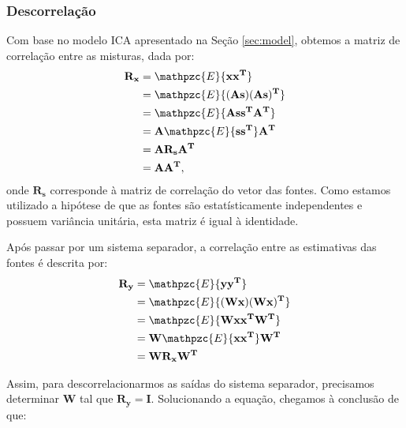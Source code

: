     \subsubsection{Descorrelação}
    Com base no modelo ICA apresentado na Seção \ref{sec:model}, obtemos a matriz de correlação entre as misturas, dada por:
    \begin{equation}
        \label{eq:correlationmatrixforx}
        \begin{split}
        \mathbf{R_x} & = \mathpzc{E}\{\mathbf{xx^T}\}\\
                     & = \mathpzc{E}\{\mathbf{(As)(As)^T}\}\\
                     & = \mathpzc{E}\{\mathbf{Ass^TA^T}\} \\
                     & = \mathbf{A}\mathpzc{E}\{\mathbf{ss^T}\}\mathbf{A^T} \\
                     & = \mathbf{A}\mathbf{R_s}\mathbf{A^T} \\
                     & = \mathbf{A}\mathbf{A^T}, \\
        \end{split}
    \end{equation}
    onde $\mathbf{R_s}$ corresponde à matriz de correlação do vetor das fontes. Como estamos utilizado a hipótese de que as fontes são estatísticamente independentes e possuem variância unitária, esta matriz é igual à identidade.
    
    Após passar por um sistema separador, a correlação entre as estimativas das fontes é descrita por:
    \begin{equation}
        \label{eq:correlationmatrixfory}
        \begin{split}
        \mathbf{R_y} & = \mathpzc{E}\{\mathbf{yy^T}\}\\
                     & = \mathpzc{E}\{\mathbf{(Wx)(Wx)^T}\}\\
                     & = \mathpzc{E}\{\mathbf{Wxx^TW^T}\} \\
                     & = \mathbf{W}\mathpzc{E}\{\mathbf{xx^T}\}\mathbf{W^T} \\
                     & = \mathbf{W}\mathbf{R_x}\mathbf{W^T}\\
        \end{split}
    \end{equation}
    
    Assim, para descorrelacionarmos as saídas do sistema separador, precisamos determinar $\mathbf{W}$ tal que $\mathbf{R_y = I}$. Solucionando a equação, chegamos à conclusão de que:
    
